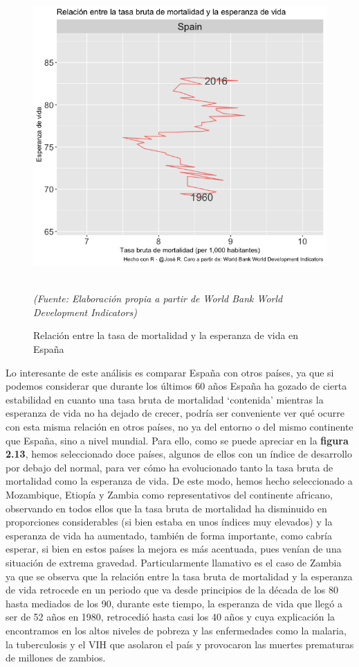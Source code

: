 \begin{figure}[!htp]
\centering
\hspace*{-1cm}
\includegraphics[scale=0.4]{Cap2/lifeexpspain.png}
\caption{Relaci\'on entre la tasa de mortalidad y la esperanza de vida en España}\\
\textit{(Fuente: Elaboración propia a partir de World Bank World Development Indicators)}
\end{figure}

Lo interesante de este análisis es comparar España con otros países, ya que si podemos considerar que durante los últimos 60 años España ha gozado de cierta estabilidad en cuanto una tasa bruta de mortalidad `contenida' mientras la esperanza de vida no ha dejado de crecer, podría ser conveniente ver qué ocurre con esta misma relación en otros países, no ya del entorno o del mismo continente que España, sino a nivel mundial. Para ello, como se puede apreciar en la \textbf{figura 2.13}, hemos seleccionado doce países, algunos de ellos con un índice de desarrollo por debajo del normal, para ver cómo ha evolucionado tanto la tasa bruta de mortalidad como la esperanza de vida. De este modo, hemos hecho seleccionado a Mozambique, Etiopía y Zambia como representativos del continente africano, observando en todos ellos que la tasa bruta de mortalidad ha disminuido en proporciones considerables (si bien estaba en unos índices muy elevados) y la esperanza de vida ha aumentado, también de forma importante, como cabría esperar, si bien en estos países la mejora es más acentuada, pues venían de una situación de extrema gravedad. Particularmente llamativo es el caso de Zambia ya que se observa que la relación entre la tasa bruta de mortalidad y la esperanza de vida retrocede en un periodo que va desde principios de la década de los 80 hasta mediados de los 90, durante este tiempo, la esperanza de vida que llegó a ser de 52 años en 1980, retrocedió hasta casi los 40 años y cuya explicación la encontramos en los altos niveles de pobreza y las enfermedades como la malaria, la tuberculosis y el VIH que asolaron el país y provocaron las muertes prematuras de millones de zambios.\\


